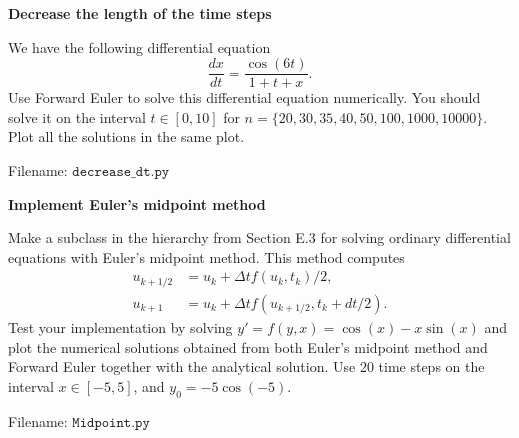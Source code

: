 
\begin{Problem}{\textbf{Decrease the length of the time steps}}

\noindent We have the following differential equation
\begin{equation*}
\frac{dx}{dt} = \frac{\cos (6t)}{1 + t + x}.
\end{equation*}
Use Forward Euler to solve this differential equation numerically. You should solve it on the interval $t \in [0, 10]$ for $n = \{20, 30, 35, 40, 50, 100, 1 000, 10 000\}$. Plot all the solutions in the same plot. 

Filename: $\texttt{decrease\_dt.py}$
\end{Problem}

\begin{Problem}{\textbf{Implement Euler's midpoint method}}

\noindent Make a subclass  in the  hierarchy from Section E.3 for solving ordinary differential equations with Euler's midpoint method. This method computes
\begin{align*}
u_{k + 1/2} &= u_{k} + \Delta tf(u_k, t_k)/2,\\
u_{k + 1} &= u_k + \Delta tf(u_{k + 1/2}, t_k + dt/2).
\end{align*}
Test your implementation by solving $y' = f(y, x) = \cos(x)-x\sin(x)$ and plot the numerical solutions obtained from both Euler's midpoint method and Forward Euler together with the analytical solution. Use $20$ time steps on the interval $x \in [-5, 5]$, and $y_0=-5\cos(-5)$.

Filename: $\texttt{Midpoint.py}$
\end{Problem}

